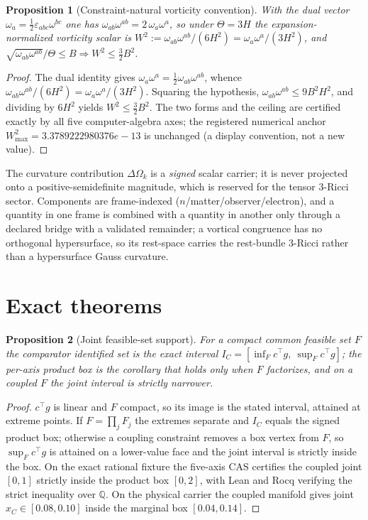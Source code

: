 \documentclass[11pt]{article}
\newtheorem{proposition}{Proposition}
\begin{document}
\begin{proposition}[Constraint-natural vorticity convention]
\label{prop:w2}
With the dual vector $\omega_a=\tfrac12\varepsilon_{abc}\omega^{bc}$ one has
$\omega_{ab}\omega^{ab}=2\,\omega_a\omega^a$, so under $\Theta=3H$ the
expansion-normalized vorticity scalar is
$W^2:=\omega_{ab}\omega^{ab}/(6H^2)=\omega_a\omega^a/(3H^2)$, and
$\sqrt{\omega_{ab}\omega^{ab}}/\Theta\le B \Rightarrow W^2\le \tfrac32 B^2$.
\end{proposition}
\begin{proof}
The dual identity gives $\omega_a\omega^a=\tfrac12\omega_{ab}\omega^{ab}$, whence
$\omega_{ab}\omega^{ab}/(6H^2)=\omega_a\omega^a/(3H^2)$. Squaring the hypothesis,
$\omega_{ab}\omega^{ab}\le 9B^2H^2$, and dividing by $6H^2$ yields $W^2\le
\tfrac32 B^2$. The two forms and the ceiling are certified exactly by all five
computer-algebra axes; the registered numerical anchor $W^2_{\max}=3.3789222980376e-13$ is
unchanged (a display convention, not a new value).
\end{proof}

The curvature contribution $\Delta\Omega_k$ is a \emph{signed} scalar carrier;
it is never projected onto a positive-semidefinite magnitude, which is reserved
for the tensor $3$-Ricci sector. Components are frame-indexed
($n$/matter/observer/electron), and a quantity in one frame is combined with a
quantity in another only through a declared bridge with a validated remainder; a
vortical congruence has no orthogonal hypersurface, so its rest-space carries the
rest-bundle $3$-Ricci rather than a hypersurface Gauss curvature.

\section{Exact theorems}
\label{sec:geom}
\begin{proposition}[Joint feasible-set support]
\label{prop:joint}
For a compact common feasible set $F$ the comparator identified set is the exact
interval $I_C=[\inf_F c^\top g,\ \sup_F c^\top g]$; the per-axis product box is
the corollary that holds only when $F$ factorizes, and on a coupled $F$ the joint
interval is strictly narrower.
\end{proposition}
\begin{proof}
$c^\top g$ is linear and $F$ compact, so its image is the stated interval,
attained at extreme points. If $F=\prod_j F_j$ the extremes separate and
$I_C$ equals the signed product box; otherwise a coupling constraint removes a
box vertex from $F$, so $\sup_F c^\top g$ is attained on a lower-value face and
the joint interval is strictly inside the box. On the exact rational fixture the
five-axis CAS certifies the coupled joint $[0,1]$ strictly inside the product
box $[0,2]$, with Lean and Rocq verifying the strict inequality over $\mathbb{Q}$.
On the physical carrier the coupled manifold gives joint $x_C\in[0.08,0.10]$
inside the marginal box $[0.04,0.14]$.
\end{proof}
\end{document}

